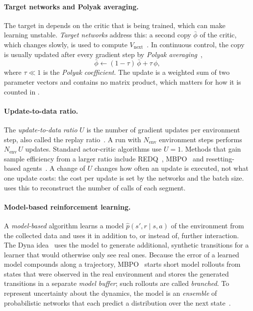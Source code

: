 \paragraph{Target networks and Polyak averaging.} The target in  depends on the critic that is being trained, which can make learning unstable.
\emph{Target networks} address this: a second copy $\bar{\phi}$ of the critic, which changes slowly, is used to compute $V_{\mathrm{next}}$~\cite{mnih2015dqn}.
In continuous control, the copy is usually updated after every gradient step by \emph{Polyak averaging}~\cite{polyak1992averaging,lillicrap2016ddpg},
\begin{equation}
  \bar{\phi} \leftarrow (1-\tau)\,\bar{\phi} + \tau\,\phi,
  \label{eq:bg-polyak}
\end{equation}
where $\tau \ll 1$ is the \emph{Polyak coefficient}.
The update is a weighted sum of two parameter vectors and contains no matrix product, which matters for how it is counted in .

\paragraph{Update-to-data ratio.} The \emph{update-to-data ratio} $U$ is the number of gradient updates per environment step, also called the replay ratio~\cite{fedus2020replay}.
A run with $N_{\mathrm{env}}$ environment steps performs $N_{\mathrm{env}}\,U$ updates.
Standard actor-critic algorithms use $U = 1$.
Methods that gain sample efficiency from a larger ratio include REDQ~\cite{chen2021redq}, MBPO~\cite{janner2019mbpo} and resetting-based agents~\cite{doro2023replayratio}.
A change of $U$ changes how often an update is executed, not what one update costs: the cost per update is set by the networks and the batch size.
 uses this to reconstruct the number of calls of each segment.

\paragraph{Model-based reinforcement learning.} A \emph{model-based} algorithm learns a model $\hat{p}(s', r \mid s, a)$ of the environment from the collected data and uses it in addition to, or instead of, further interaction.
The Dyna idea~\cite{sutton1991dyna} uses the model to generate additional, synthetic transitions for a learner that would otherwise only see real ones.
Because the error of a learned model compounds along a trajectory, MBPO~\cite{janner2019mbpo} starts short model rollouts from states that were observed in the real environment and stores the generated transitions in a separate \emph{model buffer}; such rollouts are called \emph{branched}.
To represent uncertainty about the dynamics, the model is an \emph{ensemble} of probabilistic networks that each predict a distribution over the next state~\cite{chua2018pets}.

